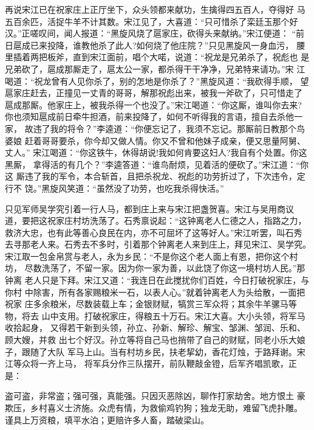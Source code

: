 再说宋江已在祝家庄上正厅坐下，众头领都来献功，生擒得四五百人，夺得好
马五百余匹，活捉牛羊不计其数。宋江见了，大喜道：“只可惜杀了栾廷玉那个好
汉。”正嗟叹间，闻人报道：“黑旋风烧了扈家庄，砍得头来献纳。”宋江便道：
“前日扈成已来投降，谁教他杀了此人?如何烧了他庄院？”只见黑旋风一身血污，
腰里插着两把板斧，直到宋江面前，唱个大喏，说道：“祝龙是兄弟杀了，祝彪也
是兄弟砍了，扈成那厮走了，扈太公一家，都杀得干干净净，兄弟特来请功。”宋
江喝道：“祝龙曾有人见你杀了，别的怎地是你杀了？”黑旋风道：“我砍得手顺，
望扈家庄赶去，正撞见一丈青的哥哥，解那祝彪出来，被我一斧砍了，只可惜走了
扈成那厮。他家庄上，被我杀得一个也没了。”宋江喝道：“你这厮，谁叫你去来?
你也须知扈成前日牵牛担酒，前来投降了，如何不听得我的言语，擅自去杀他一家，
故违了我的将令？”李逵道：“你便忘记了，我须不忘记。那厮前日教那个鸟婆娘
赶着哥哥要杀，你今却又做人情。你又不曾和他妹子成亲，便又思量阿舅、丈人。”
宋江喝道：“你这铁牛，休得胡说!我如何肯要这妇人?我自有个处置。你这黑厮，
拿得活的有几个？”李逵答道：“谁鸟耐烦，见着活的便砍了。”宋江道：“你这
厮违了我的军令，本合斩首，且把杀祝龙、祝彪的功劳折过了，下次违令，定行不
饶。”黑旋风笑道：“虽然没了功劳，也吃我杀得快活。”

只见军师吴学究引着一行人马，都到庄上来与宋江把盏贺喜。宋江与吴用商议
道，要把这祝家庄村坊洗荡了。石秀禀说起：“这钟离老人仁德之人，指路之力，
救济大忠，也有此等善心良民在内，亦不可屈坏了这等好人。”宋江听罢，叫石秀
去寻那老人来。石秀去不多时，引着那个钟离老人来到庄上，拜见宋江、吴学究。
宋江取一包金帛赏与老人，永为乡民：“不是你这个老人面上有恩，把你这个村坊，
尽数洗荡了，不留一家。因为你一家为善，以此饶了你这一境村坊人民。”那钟离
老人只是下拜。宋江又道：“我连日在此搅扰你们百姓，今日打破祝家庄，与你村
中除害，所有各家赐粮米一石，以表人心。”就着钟离老人为头给散，一面把祝家
庄多余粮米，尽数装载上车；金银财赋，犒赏三军众将；其余牛羊骡马等物，将去
山中支用。打破祝家庄，得粮五十万石。宋江大喜。大小头领，将军马收拾起身，
又得若干新到头领，孙立、孙新、解珍、解宝、邹渊、邹润、乐和、顾大嫂，并救
出七个好汉。孙立等将自己马也捎带了自己的财赋，同老小乐大娘子，跟随了大队
军马上山。当有村坊乡民，扶老挈幼，香花灯烛，于路拜谢。宋江等众将一齐上马，
将军兵分作三队摆开，前队鞭敲金镫，后军齐唱凯歌，正是：

盗可盗，非常盗；强可强，真能强。只因灭恶除凶，聊作打家劫舍。地方恨土
豪欺压，乡村喜义士济施。众虎有情，为救偷鸡钓狗；独龙无助，难留飞虎扑雕。
谨具上万资粮，填平水泊；更赔许多人畜，踏破梁山。


